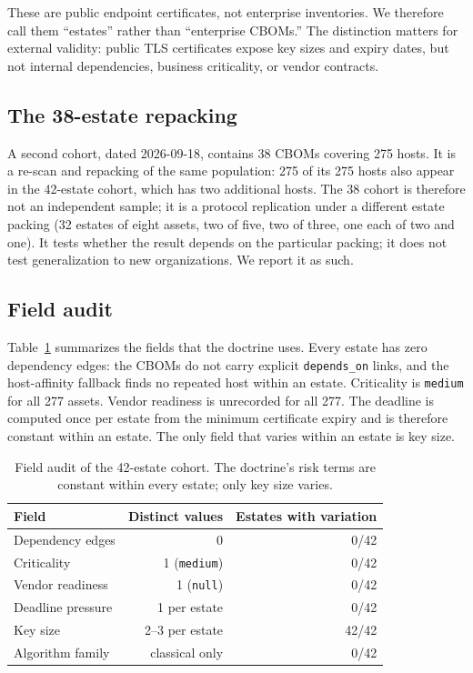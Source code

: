 \documentclass[conference,10pt]{IEEEtran}
\begin{document}
These are public endpoint certificates, not enterprise inventories. We therefore call them
``estates'' rather than ``enterprise CBOMs.'' The distinction matters for external validity:
public TLS certificates expose key sizes and expiry dates, but not internal dependencies,
business criticality, or vendor contracts.

\subsection{The 38-estate repacking}
A second cohort, dated 2026-09-18, contains 38 CBOMs covering 275 hosts. It is a re-scan and
repacking of the same population: 275 of its 275 hosts also appear in the 42-estate cohort,
which has two additional hosts. The 38 cohort is therefore not an independent sample; it is a
protocol replication under a different estate packing (32 estates of eight assets, two of five,
two of three, one each of two and one). It tests whether the result depends on the particular
packing; it does not test generalization to new organizations. We report it as such.

\subsection{Field audit}
Table~\ref{tab:audit} summarizes the fields that the doctrine uses. Every estate has zero
dependency edges: the CBOMs do not carry explicit \texttt{depends\_on} links, and the
host-affinity fallback finds no repeated host within an estate. Criticality is \texttt{medium}
for all 277 assets. Vendor readiness is unrecorded for all 277. The deadline is computed once
per estate from the minimum certificate expiry and is therefore constant within an estate. The
only field that varies within an estate is key size.

\begin{table}[t]
\centering
\caption{Field audit of the 42-estate cohort. The doctrine's risk terms are constant within
every estate; only key size varies.}
\label{tab:audit}
\footnotesize
\begin{tabular}{@{}lrr@{}}
\toprule
Field & Distinct values & Estates with variation \\
\midrule
Dependency edges & 0 & 0/42 \\
Criticality & 1 (\texttt{medium}) & 0/42 \\
Vendor readiness & 1 (\texttt{null}) & 0/42 \\
Deadline pressure & 1 per estate & 0/42 \\
Key size & 2--3 per estate & 42/42 \\
Algorithm family & classical only & 0/42 \\
\bottomrule
\end{tabular}
\end{table}
\end{document}
